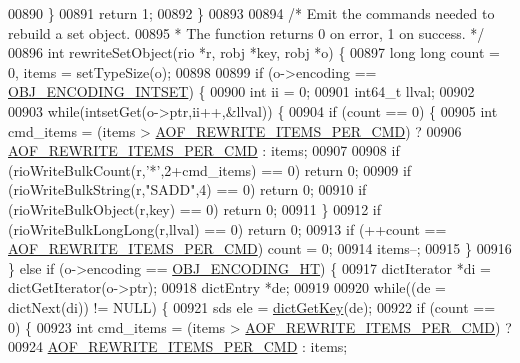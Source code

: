\begin{DoxyCode}
{{{{{{{{{{{{{{{00890     \}
00891     \textcolor{keywordflow}{return} 1;
00892 \}
00893 
00894 \textcolor{comment}{/* Emit the commands needed to rebuild a set object.}
00895 \textcolor{comment}{ * The function returns 0 on error, 1 on success. */}
00896 \textcolor{keywordtype}{int} rewriteSetObject(rio *r, robj *key, robj *o) \{
00897     \textcolor{keywordtype}{long} \textcolor{keywordtype}{long} count = 0, items = setTypeSize(o);
00898 
00899     \textcolor{keywordflow}{if} (o->encoding == \hyperlink{server_8h_a214173987de21c3b7661fddd42b05873}{OBJ\_ENCODING\_INTSET}) \{
00900         \textcolor{keywordtype}{int} ii = 0;
00901         int64\_t llval;
00902 
00903         \textcolor{keywordflow}{while}(intsetGet(o->ptr,ii++,&llval)) \{
00904             \textcolor{keywordflow}{if} (count == 0) \{
00905                 \textcolor{keywordtype}{int} cmd\_items = (items > \hyperlink{server_8h_a437bda3214c8acb2835f49eb68919507}{AOF\_REWRITE\_ITEMS\_PER\_CMD}) ?
00906                     \hyperlink{server_8h_a437bda3214c8acb2835f49eb68919507}{AOF\_REWRITE\_ITEMS\_PER\_CMD} : items;
00907 
00908                 \textcolor{keywordflow}{if} (rioWriteBulkCount(r,\textcolor{stringliteral}{'*'},2+cmd\_items) == 0) \textcolor{keywordflow}{return} 0;
00909                 \textcolor{keywordflow}{if} (rioWriteBulkString(r,\textcolor{stringliteral}{"SADD"},4) == 0) \textcolor{keywordflow}{return} 0;
00910                 \textcolor{keywordflow}{if} (rioWriteBulkObject(r,key) == 0) \textcolor{keywordflow}{return} 0;
00911             \}
00912             \textcolor{keywordflow}{if} (rioWriteBulkLongLong(r,llval) == 0) \textcolor{keywordflow}{return} 0;
00913             \textcolor{keywordflow}{if} (++count == \hyperlink{server_8h_a437bda3214c8acb2835f49eb68919507}{AOF\_REWRITE\_ITEMS\_PER\_CMD}) count = 0;
00914             items--;
00915         \}
00916     \} \textcolor{keywordflow}{else} \textcolor{keywordflow}{if} (o->encoding == \hyperlink{server_8h_a9c10219f68afc557d510d108257d238b}{OBJ\_ENCODING\_HT}) \{
00917         dictIterator *di = dictGetIterator(o->ptr);
00918         dictEntry *de;
00919 
00920         \textcolor{keywordflow}{while}((de = dictNext(di)) != NULL) \{
00921             sds ele = \hyperlink{dict_8h_a3271c334309904a3086deca94f96e46e}{dictGetKey}(de);
00922             \textcolor{keywordflow}{if} (count == 0) \{
00923                 \textcolor{keywordtype}{int} cmd\_items = (items > \hyperlink{server_8h_a437bda3214c8acb2835f49eb68919507}{AOF\_REWRITE\_ITEMS\_PER\_CMD}) ?
00924                     \hyperlink{server_8h_a437bda3214c8acb2835f49eb68919507}{AOF\_REWRITE\_ITEMS\_PER\_CMD} : items;
}}}}}}}}}}}}}}}
\end{DoxyCode}
